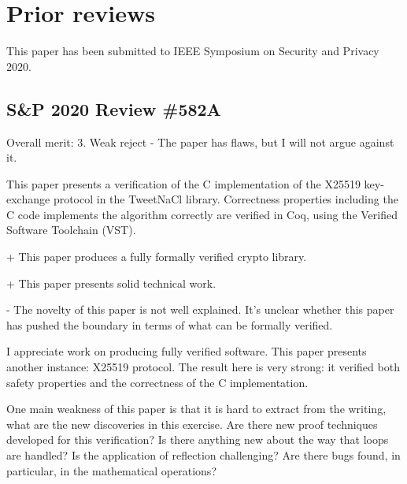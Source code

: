 \section{Prior reviews}
\label{appendix:past-reviews}

This paper has been submitted to IEEE Symposium on Security and Privacy 2020.

\subsection{S\&P 2020 Review \#582A}

Overall merit: 3. Weak reject - The paper has flaws, but I will not argue against it.


\begin{center}
\end{center}

This paper presents a verification of the C implementation of the X25519
key-exchange protocol in the TweetNaCl library.  Correctness properties
including the C code implements the algorithm correctly are verified in Coq,
using the Verified Software Toolchain (VST).


\begin{center}
\end{center}

+ This paper produces a fully formally verified crypto library.

+ This paper presents solid technical work.


\begin{center}
\end{center}

- The novelty of this paper is not well explained. It's unclear whether this
paper has pushed the boundary in terms of what can be formally verified.


\begin{center}
\end{center}

I appreciate work on producing fully verified software. This paper presents
another instance: X25519 protocol. The result here is very strong: it verified
both safety properties and the correctness of the C implementation.

One main weakness of this paper is that it is hard to extract from the writing,
what are the new discoveries in this exercise. Are there new proof techniques
developed for this verification? Is there anything new about the way that loops
are handled? Is the application of reflection challenging? Are there bugs found,
in particular, in the mathematical operations?

